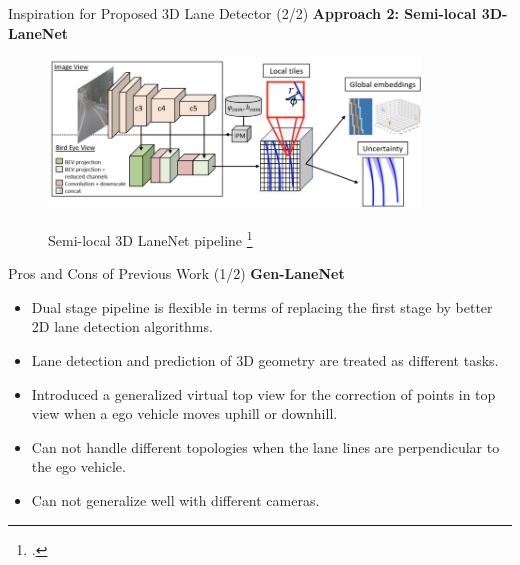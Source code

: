 \documentclass[aspectratio=169]{beamer}
\begin{document}
\begin{frame}{Inspiration for Proposed 3D Lane Detector (2/2)}
\textbf{Approach 2: Semi-local 3D-LaneNet}

 \begin{figure}[H]
     \centering
     
\includegraphics[width=0.8\linewidth, height=4cm]{images/3DLaneNET++.png} 
\label{fig:subim1}

\caption{Semi-local 3D LaneNet pipeline \footcite{DBLP:journals/corr/abs-2011-01535} }
\label{fig:image2}
\end{figure}
\end{frame}
\begin{frame}{Pros and Cons of Previous Work (1/2)}
    \textbf{Gen-LaneNet}
    
    \begin{itemize}
        \item Dual stage pipeline is flexible in terms of replacing the first stage by better 2D lane detection algorithms. 
        \item Lane detection and prediction of 3D geometry are treated as different tasks. 
        \item Introduced a generalized virtual top view for the correction of points in top view when a ego vehicle moves uphill or downhill.
        \item Can not handle different topologies when the lane lines are perpendicular to the ego vehicle.
        \item Can not generalize well with different cameras.
    \end{itemize}

\end{frame}
\end{document}

